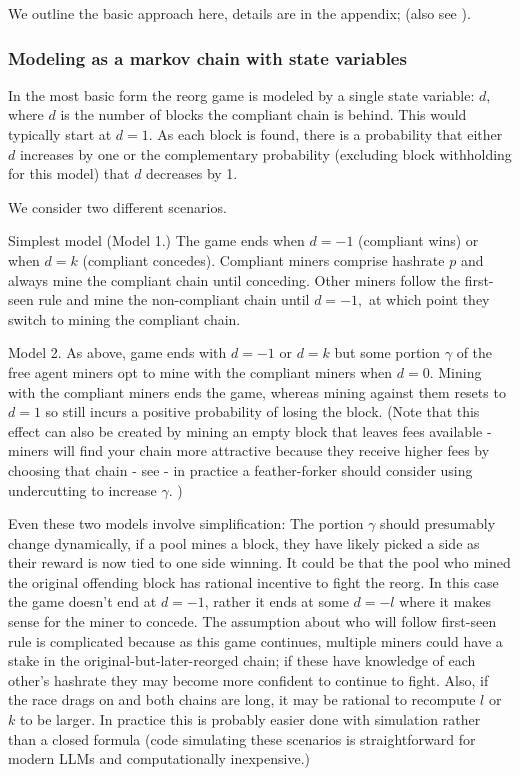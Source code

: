 \documentclass{article}%
\begin{document}
We outline the basic approach here, details are in the appendix; (also see
\cite[Chapter 5]{Warren23}).

\subsubsection{Modeling as a markov chain with state variables}

In the most basic form the reorg game is modeled by a single state variable:
$d,$ where $d$ is the number of blocks the compliant chain is behind.  This
would typically start at $d=1$.  As each block is found, there is a
probability that either $d$ increases by one or the complementary probability
(excluding block withholding for this model) that $d$ decreases by 1.

We consider two different scenarios.

Simplest model (Model 1.) The game ends when $d=-1$ (compliant wins) or when
$d=k$ (compliant concedes). Compliant miners comprise hashrate $p$ and always
mine the compliant chain until conceding.  Other miners follow the first-seen
rule and mine the non-compliant chain until $d=-1,$ at which point they switch
to mining the compliant chain.

Model 2.  As above, game ends with $d=-1$ or $d=k$ but some portion $\gamma$
of the free agent miners opt to mine with the compliant miners when $d=0.$
Mining with the compliant miners ends the game, whereas mining
against them resets to $d=1$ so still incurs a positive probability of losing
the block.  (Note that this effect can also be created by mining an empty
block that leaves fees available - miners will find your chain more attractive
because they receive higher fees by choosing that chain - see
\cite{Carlsten16} - in practice a feather-forker should consider using undercutting to increase $\gamma$. )

Even these two models involve simplification: The portion $\gamma$ should
presumably change dynamically, if a pool mines a block, they have likely
picked a side as their reward is now tied to one side winning.  It could be
that the pool who mined the original offending block has rational incentive to
fight the reorg.  In this case the game doesn't end at $d=-1$, rather it ends
at some $d=-l$ where it makes sense for the miner to concede.  The assumption
about who will follow first-seen rule is complicated because as this game
continues, multiple miners could have a stake in the original-but-later-reorged
chain; if these have knowledge of each other's hashrate they may become more
confident to continue to fight.  Also, if the race drags on and both chains
are long, it may be rational to recompute $l$ or $k$ to be larger.  In
practice this is probably easier done with simulation rather than a closed
formula (code simulating these scenarios is straightforward for modern LLMs and
computationally inexpensive.)
\end{document}
